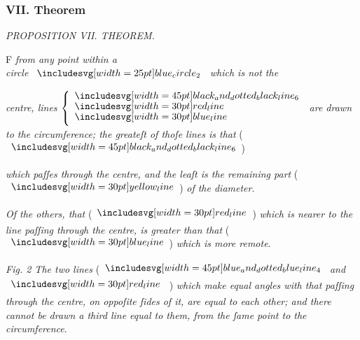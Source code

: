 \documentclass[12pt,preview]{standalone}
\begin{document}
\subsubsection{VII. Theorem}

\begin{minipage}[t]{0.54\textwidth}
    \begin{center}
        \textit{PROPOSITION VII. THEOREM.}\label{book3pr7}\\
    \end{center}

    \hfill

    \begin{center}
        \raggedright \lettrine[lines=3, loversize=1, nindent=0pt]{}{}F \textit{from any point within a\\ circle} $\img{blue_circle_2}$ \textit{which is not the}
    \end{center}
    \textit{centre, lines} $\left\{\begin{aligned} & \bimg{black_and_dotted_black_line_6} \\[-2ex] & \redline \\[-2ex] & \blueline \end{aligned}\right.$ \textit{are drawn to the circumference; the greateſt of thoſe lines is that} (\hspace{-1ex}$\bimg{black_and_dotted_black_line_6}$\hspace{-1ex}) \raggedright \textit{which paſſes through the centre, and the leaſt is the remaining part} (\hspace{-1ex}$\yellowline$\hspace{-1ex}) \textit{of the diameter}.

    \hfill

    \textit{Of the others, that} (\hspace{-1ex}$\redline$\hspace{-1ex}) \textit{which is nearer to the line paſſing through the centre, is greater than that} (\hspace{-1ex}$\blueline$\hspace{-1ex}) \textit{which is more remote}.

    \hfill

    \textit{Fig. 2 The two lines} (\hspace{-1ex}$\bimg{blue_and_dotted_blue_line_4}$ \textit{and} $\redline$ \hspace{-1ex}) \textit{which make equal angles with that paſſing through the centre, on oppoſite ſides of it, are equal to each other; and there cannot be drawn a third line equal to them, from the ſame point to the circumference}.
\end{minipage}%
\end{document}

